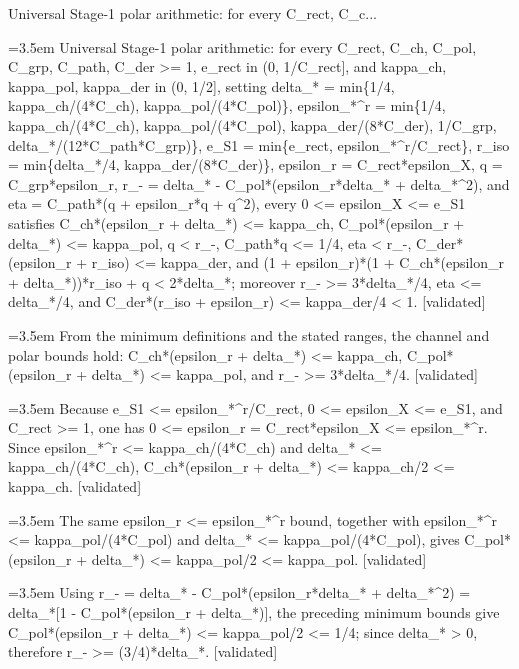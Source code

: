 \documentclass{article}
\newcommand{\step}[1]{\par\noindent\hangindent=3.5em\hangafter=1%
  \makebox[3.5em][l]{\textbf{#1.}}}
\newcommand{\steptag}[1]{\hfill{\small\textsf{[#1]}}}
\begin{document}
\begin{proofbox}{Universal Stage-1 polar arithmetic: for every C\_rect, C\_c...}
\step{1} Universal Stage-1 polar arithmetic: for every C\_rect, C\_ch, C\_pol, C\_grp, C\_path, C\_der >= 1, e\_rect in (0, 1/C\_rect], and kappa\_ch, kappa\_pol, kappa\_der in (0, 1/2], setting delta\_* = min\{1/4, kappa\_ch/(4*C\_ch), kappa\_pol/(4*C\_pol)\}, epsilon\_*\textasciicircum{}r = min\{1/4, kappa\_ch/(4*C\_ch), kappa\_pol/(4*C\_pol), kappa\_der/(8*C\_der), 1/C\_grp, delta\_*/(12*C\_path*C\_grp)\}, e\_S1 = min\{e\_rect, epsilon\_*\textasciicircum{}r/C\_rect\}, r\_iso = min\{delta\_*/4, kappa\_der/(8*C\_der)\}, epsilon\_r = C\_rect*epsilon\_X, q = C\_grp*epsilon\_r, r\_- = delta\_* - C\_pol*(epsilon\_r*delta\_* + delta\_*\textasciicircum{}2), and eta = C\_path*(q + epsilon\_r*q + q\textasciicircum{}2), every 0 <= epsilon\_X <= e\_S1 satisfies C\_ch*(epsilon\_r + delta\_*) <= kappa\_ch, C\_pol*(epsilon\_r + delta\_*) <= kappa\_pol, q < r\_-, C\_path*q <= 1/4, eta < r\_-, C\_der*(epsilon\_r + r\_iso) <= kappa\_der, and (1 + epsilon\_r)*(1 + C\_ch*(epsilon\_r + delta\_*))*r\_iso + q < 2*delta\_*; moreover r\_- >= 3*delta\_*/4, eta <= delta\_*/4, and C\_der*(r\_iso + epsilon\_r) <= kappa\_der/4 < 1. \steptag{validated} \\[6pt]
\step{1.1} From the minimum definitions and the stated ranges, the channel and polar bounds hold: C\_ch*(epsilon\_r + delta\_*) <= kappa\_ch, C\_pol*(epsilon\_r + delta\_*) <= kappa\_pol, and r\_- >= 3*delta\_*/4. \steptag{validated} \\[6pt]
\step{1.1.1} Because e\_S1 <= epsilon\_*\textasciicircum{}r/C\_rect, 0 <= epsilon\_X <= e\_S1, and C\_rect >= 1, one has 0 <= epsilon\_r = C\_rect*epsilon\_X <= epsilon\_*\textasciicircum{}r. Since epsilon\_*\textasciicircum{}r <= kappa\_ch/(4*C\_ch) and delta\_* <= kappa\_ch/(4*C\_ch), C\_ch*(epsilon\_r + delta\_*) <= kappa\_ch/2 <= kappa\_ch. \steptag{validated} \\[4pt]
\step{1.1.2} The same epsilon\_r <= epsilon\_*\textasciicircum{}r bound, together with epsilon\_*\textasciicircum{}r <= kappa\_pol/(4*C\_pol) and delta\_* <= kappa\_pol/(4*C\_pol), gives C\_pol*(epsilon\_r + delta\_*) <= kappa\_pol/2 <= kappa\_pol. \steptag{validated} \\[4pt]
\step{1.1.3} Using r\_- = delta\_* - C\_pol*(epsilon\_r*delta\_* + delta\_*\textasciicircum{}2) = delta\_*[1 - C\_pol*(epsilon\_r + delta\_*)], the preceding minimum bounds give C\_pol*(epsilon\_r + delta\_*) <= kappa\_pol/2 <= 1/4; since delta\_* > 0, therefore r\_- >= (3/4)*delta\_*. \steptag{validated} \\[4pt]

\end{proofbox}
\end{document}
